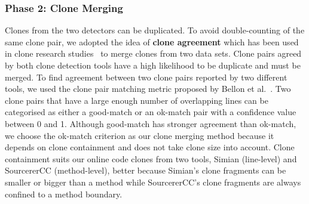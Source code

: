 \documentclass[10pt,journal,compsoc]{IEEEtran}
\begin{document}
\subsubsection{Phase 2: Clone Merging} Clones from the two detectors can be
duplicated. To avoid double-counting of the same clone pair, we adopted the idea
of \textbf{clone agreement} which has been used in clone research
studies~\cite{Funaro2010, Wang2013,cr2016ssbse} to merge clones from two data
sets. Clone pairs agreed by both clone detection tools have a high
likelihood to be duplicate and must be merged. 
To find agreement between two clone
pairs reported by two different tools, we used the clone pair matching metric
proposed by Bellon et al.~\cite{Bellon2007}. Two clone pairs that have a large
enough number of overlapping lines can be categorised as either a good-match or
an ok-match pair with a
confidence value between 0 and 1. Although good-match has stronger agreement
than ok-match, we choose the ok-match criterion as our clone merging method
because it depends on clone containment and does
not take clone size into account. Clone containment suits our online code clones
from two tools, Simian (line-level) and SourcererCC (method-level), better
because Simian's clone fragments can be smaller or bigger than a method
while SourcererCC's clone fragments are always confined to a method boundary.
\end{document}
